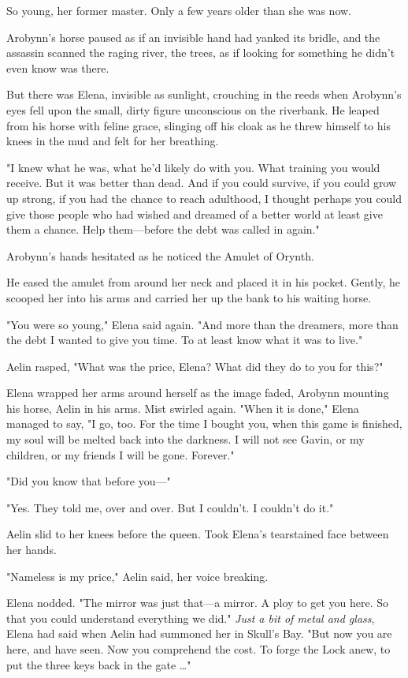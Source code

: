 So young, her former master. Only a few years older than she was now.

Arobynn's horse paused as if an invisible hand had yanked its bridle, and the assassin scanned the raging river, the trees, as if looking for something he didn't even know was there.

But there was Elena, invisible as sunlight, crouching in the reeds when Arobynn's eyes fell upon the small, dirty figure unconscious on the riverbank. He leaped from his horse with feline grace, slinging off his cloak as he threw himself to his knees in the mud and felt for her breathing.

"I knew what he was, what he'd likely do with you. What training you would receive. But it was better than dead. And if you could survive, if you could grow up strong, if you had the chance to reach adulthood, I thought perhaps you could give those people who had wished and dreamed of a better world  at least give them a chance. Help them---before the debt was called in again."

Arobynn's hands hesitated as he noticed the Amulet of Orynth.

He eased the amulet from around her neck and placed it in his pocket. Gently, he scooped her into his arms and carried her up the bank to his waiting horse.

"You were so young," Elena said again. "And more than the dreamers, more than the debt  I wanted to give you time. To at least know what it was to live."

Aelin rasped, "What was the price, Elena? What did they do to you for this?"

Elena wrapped her arms around herself as the image faded, Arobynn mounting his horse, Aelin in his arms. Mist swirled again. "When it is done," Elena managed to say, "I go, too. For the time I bought you, when this game is finished, my soul will be melted back into the darkness. I will not see Gavin, or my children, or my friends  I will be gone. Forever."

"Did you know that before you---"

"Yes. They told me, over and over. But  I couldn't. I couldn't do it."

Aelin slid to her knees before the queen. Took Elena's tearstained face between her hands.

"Nameless is my price," Aelin said, her voice breaking.

Elena nodded. "The mirror was just that---a mirror. A ploy to get you here. So that you could understand everything we did." \emph{Just a bit of metal and glass}, Elena had said when Aelin had summoned her in Skull's Bay. "But now you are here, and have seen. Now you comprehend the cost. To forge the Lock anew, to put the three keys back in the gate
\ldots"


